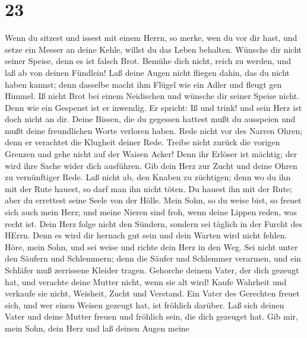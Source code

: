 \hypertarget{section-22}{%
\section{23}\label{section-22}}

 Wenn du sitzest und issest mit einem Herrn, so merke, wen
du vor dir hast,  und setze ein Messer an deine Kehle,
willst du das Leben behalten.  Wünsche dir nicht seiner
Speise, denn es ist falsch Brot.  Bemühe dich nicht, reich
zu werden, und laß ab von deinen Fündlein!  Laß deine Augen
nicht fliegen dahin, das du nicht haben kannst; denn dasselbe macht ihm
Flügel wie ein Adler und fleugt gen Himmel.  Iß nicht Brot
bei einem Neidischen und wünsche dir seiner Speise nicht. 
Denn wie ein Gespenst ist er inwendig. Er spricht: Iß und trink! und
sein Herz ist doch nicht an dir.  Deine Bissen, die du
gegessen hattest mußt du ausspeien und mußt deine freundlichen Worte
verloren haben.  Rede nicht vor des Narren Ohren; denn er
verachtet die Klugheit deiner Rede.  Treibe nicht zurück
die vorigen Grenzen und gehe nicht auf der Waisen Acker! 
Denn ihr Erlöser ist mächtig; der wird ihre Sache wider dich ausführen.
 Gib dein Herz zur Zucht und deine Ohren zu vernünftiger
Rede.  Laß nicht ab, den Knaben zu züchtigen; denn wo du
ihn mit der Rute hauest, so darf man ihn nicht töten.  Du
hauest ihn mit der Rute; aber du errettest seine Seele von der Hölle.
 Mein Sohn, so du weise bist, so freuet sich auch mein
Herz;  und meine Nieren sind froh, wenn deine Lippen reden,
was recht ist.  Dein Herz folge nicht den Sündern, sondern
sei täglich in der Furcht des HErrn.  Denn es wird dir
hernach gut sein und dein Warten wird nicht fehlen.  Höre,
mein Sohn, und sei weise und richte dein Herz in den Weg. 
Sei nicht unter den Säufern und Schlemmern;  denn die
Säufer und Schlemmer verarmen, und ein Schläfer muß zerrissene Kleider
tragen.  Gehorche deinem Vater, der dich gezeugt hat, und
verachte deine Mutter nicht, wenn sie alt wird!  Kaufe
Wahrheit und verkaufe sie nicht, Weisheit, Zucht und Verstand.
 Ein Vater des Gerechten freuet sich, und wer einen Weisen
gezeugt hat, ist fröhlich darüber.  Laß sich deinen Vater
und deine Mutter freuen und fröhlich sein, die dich gezeuget hat.
 Gib mir, mein Sohn, dein Herz und laß deinen Augen meine
